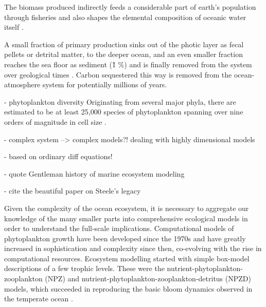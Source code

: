 \documentclass[journal abbreviation, manuscript]{copernicus}
\begin{document}
The biomass produced indirectly feeds a considerable part of earth’s population through fisheries \citep{Stock2017} and also shapes the elemental composition of oceanic water itself \citep{Redfield1958}.

A small fraction of primary production sinks out of the photic layer as fecal pellets or detrital matter, to the deeper ocean, and an even smaller fraction reaches the sea floor as sediment (\~ 1 \%) and is finally removed from the system over geological times \citep{Honjo2008}. Carbon sequestered this way is removed from the ocean-atmosphere system for potentially millions of years.

- phytoplankton diversity 
Originating from several major phyla, there are estimated to be at least 25,000 species of phytoplankton \citep{Falkowski2004a} spanning over nine orders of magnitude in cell size \citep{Sieburth1978PelagicFractions, Finkel2010}.

- complex system --> complex models?! dealing with highly dimensional models \citep{Dutkiewicz2020DimensionsDiversity}


- based on ordinary diff equations!

- quote Gentleman history of marine ecosystem modeling \citep{Gentleman2003a}

- cite the beautiful paper on Steele's legacy \citep{Anderson2019RememberingEcosystems}

Given the complexity of the ocean ecosystem, it is necessary to aggregate our knowledge of the many smaller parts into comprehensive ecological models in order to understand the full-scale implications. Computational models of phytoplankton growth have been developed since the 1970s and have greatly increased in sophistication and complexity since then, co-evolving with the rise in computational resources. Ecosystem modelling started with simple box-model descriptions of a few trophic levels. These were the nutrient-phytoplankton-zooplankton (NPZ) and nutrient-phytoplankton-zooplankton-detritus (NPZD) models, which succeeded in reproducing the basic bloom dynamics observed in the temperate ocean \citep{Evans1985ACycles, Fasham1990a}. 

\end{document}

